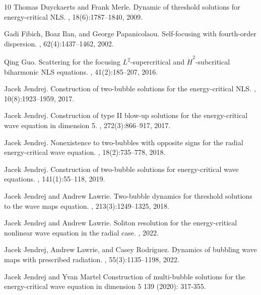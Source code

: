 \documentclass[a4paper,two-side,10pt]{amsart}
\numberwithin{equation}{section}
\begin{document}
\begin{thebibliography}{10}
Thomas Duyckaerts and Frank Merle.
\newblock Dynamic of threshold solutions for energy-critical {NLS}.
, 18(6):1787--1840, 2009.

Gadi Fibich, Boaz Ilan, and George Papanicolaou.
\newblock Self-focusing with fourth-order dispersion.
, 62(4):1437--1462, 2002.

Qing Guo.
\newblock Scattering for the focusing {$L^2$}-supercritical and
  {$\dot{H}^2$}-subcritical biharmonic {NLS} equations.
, 41(2):185--207, 2016.

Jacek Jendrej.
\newblock Construction of two-bubble solutions for the energy-critical {NLS}.
, 10(8):1923--1959, 2017.

Jacek Jendrej.
\newblock Construction of type {II} blow-up solutions for the energy-critical
  wave equation in dimension 5.
, 272(3):866--917, 2017.

Jacek Jendrej.
\newblock Nonexistence to two-bubbles with opposite signs for the radial
  energy-critical wave equation.
, 18(2):735--778, 2018.

Jacek Jendrej.
\newblock Construction of two-bubble solutions for energy-critical wave
  equations.
, 141(1):55--118, 2019.

Jacek Jendrej and Andrew Lawrie.
\newblock Two-bubble dynamics for threshold solutions to the wave maps
  equation.
, 213(3):1249--1325, 2018.

Jacek Jendrej and Andrew Lawrie.
\newblock Soliton resolution for the energy-critical nonlinear wave equation in
  the radial case.
, 2022.

Jacek Jendrej, Andrew Lawrie, and Casey Rodriguez.
\newblock Dynamics of bubbling wave maps with prescribed radiation.
, 55(3):1135--1198, 2022.


Jacek Jendrej and Yvan Martel
\newblock Construction of multi-bubble solutions for the energy-critical
wave equation in dimension $5$
 139 (2020): 317-355.



\end{thebibliography}
\end{document}
